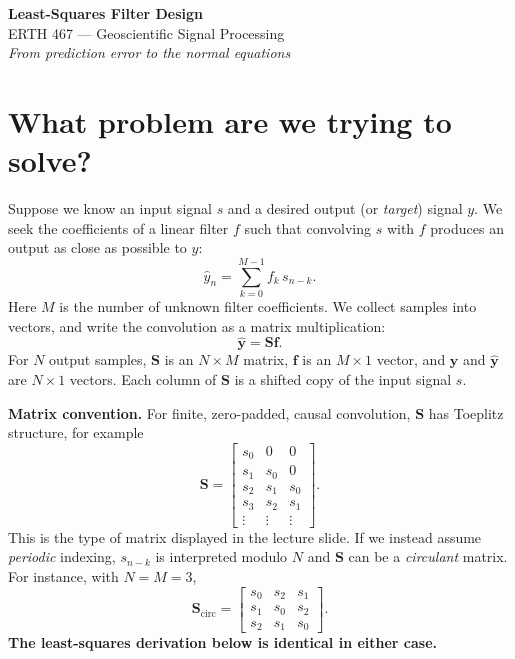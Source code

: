 \documentclass[11pt,letterpaper]{article}
\newcommand{\Smat}{\mathbf{S}}
\newcommand{\fvec}{\mathbf{f}}
\newcommand{\yvec}{\mathbf{y}}
\begin{document}
\begin{center}
{\Large\bfseries Least-Squares Filter Design}\\[4pt]
{\large ERTH 467 --- Geoscientific Signal Processing}\\[3pt]
\emph{From prediction error to the normal equations}
\end{center}

\section{What problem are we trying to solve?}
Suppose we know an input signal $s$ and a desired output (or \emph{target}) signal $y$.
We seek the coefficients of a linear filter $f$ such that convolving $s$ with $f$
produces an output as close as possible to $y$:
\begin{equation}
    \widehat y_n = \sum_{k=0}^{M-1}f_k\,s_{n-k}.
    \label{eq:convolution}
\end{equation}
Here $M$ is the number of unknown filter coefficients. We collect samples into vectors,
and write the convolution as a matrix multiplication:
\begin{equation}
    \boxed{\widehat{\yvec}=\Smat\fvec.}
\end{equation}
For $N$ output samples, $\Smat$ is an $N\times M$ matrix, $\fvec$ is an $M\times 1$
vector, and $\yvec$ and $\widehat{\yvec}$ are $N\times 1$ vectors.
Each column of $\Smat$ is a shifted copy of the input signal $s$.

\textbf{Matrix convention.} For finite, zero-padded, causal convolution, $\Smat$ has
Toeplitz structure, for example
\begin{equation}
\Smat=\begin{bmatrix}
s_0&0&0\\
s_1&s_0&0\\
s_2&s_1&s_0\\
s_3&s_2&s_1\\
\vdots&\vdots&\vdots
\end{bmatrix}.
\end{equation}
This is the type of matrix displayed in the lecture slide. If we instead assume
\emph{periodic} indexing, $s_{n-k}$ is interpreted modulo $N$ and $\Smat$
can be a \emph{circulant} matrix. For instance, with $N=M=3$,
\begin{equation}
\Smat_{\mathrm{circ}}=\begin{bmatrix}
s_0&s_2&s_1\\
s_1&s_0&s_2\\
s_2&s_1&s_0
\end{bmatrix}.
\end{equation}
\textbf{The least-squares derivation below is identical in either case.}
\end{document}
